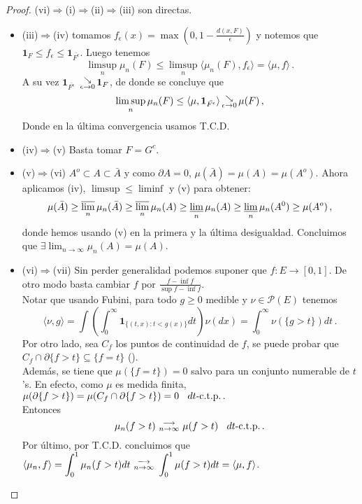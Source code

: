 \begin{proof}
\gris
(vi)$\Rightarrow$(i)$\Rightarrow$(ii)$\Rightarrow$(iii) son directas.

\begin{itemize}
    \item[] (iii)$\Rightarrow$(iv) tomamos $f_\epsilon(x)=\max(0,1-\frac{d(x,F)}{\epsilon})$ y notemos que $\mathbf{1}_F\leq f_\epsilon\leq\mathbf{1}_\bar{{F^\epsilon}}$. Luego tenemos
    $$\displaystyle\limsup_{n}\mu_n(F)\leq\limsup_{n}\langle\mu_n(F),f_\epsilon\rangle=\langle\mu,f\rangle \, .$$
    A su vez $\mathbf{1}_\bar{{F^\epsilon}}$ $\,\substack{\searrow \\ \tiny{\epsilon\to 0}}\,\mathbf{1}_F$, de donde se concluye que
    $$ \displaystyle\limsup_n\mu_n(F)\leq \langle \mu,\mathbf{1}_{\bar{{F^\epsilon}}} \rangle \,\substack{\searrow \\ \tiny{\epsilon\to 0}}\, \mu(F) \, ,$$
    Donde en la última convergencia usamos T.C.D.
    \item[] (iv)$\Rightarrow$(v) Basta tomar $F=G^c$.
    \item[] (v)$\Rightarrow$(vi) $A^o \subset A\subset \bar{A}$ y como $\partial A=0$, $\mu(\bar{A})=\mu(A)=\mu(A^o)$. Ahora aplicamos (iv), $\limsup\leq\liminf$ y (v) para obtener: $$\mu(\bar{A})\geq \displaystyle \varlimsup_n \mu_n(\bar{A}) \geq \varlimsup_n \mu_n(A) \geq \varliminf_{n}\mu_n(A) \geq \varliminf_{n} \mu_n(A^0) \geq\mu(A^o) \, ,$$ donde hemos usando (v) en la primera y la última desigualdad. Concluimos que $\exists \lim_{n\to\infty}\mu_n(A)=\mu(A)$.
    \item[] (vi)$\Rightarrow$(vii) Sin perder generalidad podemos suponer que $f:E\longrightarrow[0,1]$. De otro modo basta cambiar $f$ por $\frac{f-\inf f}{\sup f - \inf f}$.
    \\ Notar que usando Fubini, para todo $g\geq0$ medible y $\nu\in\mathcal{P}(E)$ tenemos
    $$ \langle \nu,g \rangle = \displaystyle\int(\int^\infty_0 \mathbf{1}_{\{(t,x):t<g(x)\}}dt)\nu(dx)=\int^\infty_0\nu(\{g>t\})dt \, .$$
    Por otro lado, sea $C_f$ los puntos de continuidad de $f$, se puede probar que  $C_f\cap\partial\{f>t\}\subseteq\{f=t\}$ (\ejercicio \gris ).
    \\ Además, se tiene que $\mu(\{f=t\})=0$ salvo para un conjunto numerable de $t$'s. En efecto, como $\mu$ es medida finita, $\mu(\partial\{f>t\})=\mu(C_f\cap \partial\{f>t\})=0 \hspace{.25cm}\, dt\mbox{-c.t.p.} \, .$
    \\ Entonces $$ \mu_n(f>t) \mbox{ }\substack{\longrightarrow \\ n\to\infty}\mbox{ } \mu(f>t) \hspace{.25cm}\, dt\mbox{-c.t.p.} \, .$$
    Por último, por T.C.D. concluimos que $\langle \mu_n,f \rangle = \displaystyle\int^1_0 \mu_n(f>t)dt \mbox{ }\substack{\longrightarrow \\ n\to\infty}\mbox{ } \int^1_0\mu(f>t)dt = \langle \mu, f\rangle$.
\end{itemize}
\findem \negro
\end{proof}

